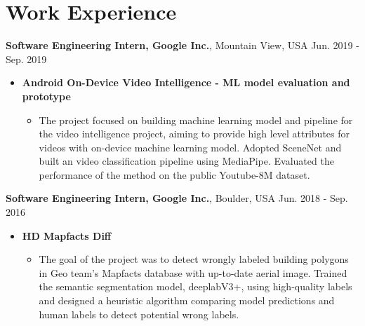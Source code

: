 \documentclass[a4paper,9pt]{article}
\begin{document}
\section{Work Experience}
\textbf{Software Engineering Intern, Google Inc.}, Mountain View, USA \hfill Jun. 2019 - Sep. 2019 \par
\begin{itemize}
    \item \textbf{Android On-Device Video Intelligence - ML model evaluation and prototype}
    \begin{itemize}
        \item The project focused on building machine learning model and pipeline for the video intelligence project, aiming to provide high level attributes for videos with on-device machine learning model. Adopted SceneNet and built an video classification pipeline using MediaPipe. Evaluated the performance of the method on the public Youtube-8M dataset.
    \end{itemize}
\end{itemize}
\textbf{Software Engineering Intern, Google Inc.}, Boulder, USA \hfill Jun. 2018 - Sep. 2016 \par
\begin{itemize}
    \item \textbf{HD Mapfacts Diff}
    \begin{itemize}
        \item The goal of the project was to detect wrongly labeled building polygons in Geo team's Mapfacts database with up-to-date aerial image. Trained the semantic segmentation model, deeplabV3+, using high-quality labels and designed a heuristic algorithm comparing model predictions and human labels to detect potential wrong labels.
    \end{itemize}
\end{itemize}
\end{document}
